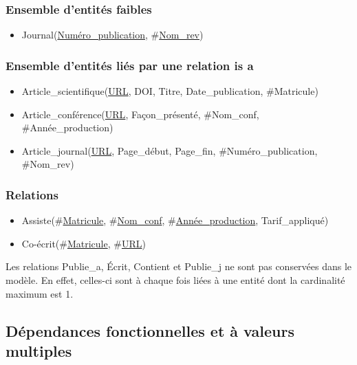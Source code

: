 \documentclass[a4paper, 12pt]{article}
\begin{document}
	\subsubsection{Ensemble d'entités faibles}
	\begin{itemize}
		\item Journal(\underline{Numéro\_publication}, \#\underline{Nom\_rev})
	\end{itemize}
	\subsubsection{Ensemble d'entités liés par une relation \og is a\fg{}}
	\begin{itemize}
		\item Article\_scientifique(\underline{URL}, DOI, Titre, Date\_publication, \#Matricule)
		\item Article\_conférence(\underline{URL}, Façon\_présenté, \#Nom\_conf, \#Année\_production)
		\item Article\_journal(\underline{URL}, Page\_début, Page\_fin, \#Numéro\_publication, \#Nom\_rev)
	\end{itemize}
	\subsubsection{Relations}
	\begin{itemize}
		\item Assiste(\#\underline{Matricule}, \#\underline{Nom\_conf}, \#\underline{Année\_production}, Tarif\_appliqué)
		\item Co-écrit(\#\underline{Matricule}, \#\underline{URL})
	\end{itemize}
	Les relations Publie\_a, Écrit, Contient et Publie\_j ne sont pas conservées dans le modèle. En effet, celles-ci sont à chaque fois liées à une entité dont la cardinalité maximum est 1.
	\subsection{Dépendances fonctionnelles et à valeurs multiples}
\end{document}
